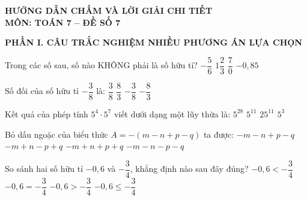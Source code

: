 \documentclass[12pt,a4paper]{article}
\begin{document}
\begin{center}
\textbf{\Large HƯỚNG DẪN CHẤM VÀ LỜI GIẢI CHI TIẾT}\\
\vspace{1.5mm}
\textbf{\large MÔN: TOÁN 7 -- ĐỀ SỐ 7}
\end{center}
\vspace{2mm}

\noindent\textbf{\large PHẦN I. CÂU TRẮC NGHIỆM NHIỀU PHƯƠNG ÁN LỰA CHỌN}

\vspace{1mm}
\begin{ex}
Trong các số sau, số nào KHÔNG phải là số hữu tỉ?
\choice
{$-\dfrac{5}{6}$}
{$1\dfrac{2}{3}$}
{\True $\dfrac{7}{0}$}
{$-0{,}85$}
\end{ex}

\begin{ex}
Số đối của số hữu tỉ $-\dfrac{3}{8}$ là:
\choice
{\True $\dfrac{3}{8}$}
{$\dfrac{8}{3}$}
{$-\dfrac{3}{8}$}
{$-\dfrac{8}{3}$}
\end{ex}

\begin{ex}
Kết quả của phép tính $5^4 \cdot 5^7$ viết dưới dạng một lũy thừa là:
\choice
{$5^{28}$}
{\True $5^{11}$}
{$25^{11}$}
{$5^3$}
\end{ex}

\begin{ex}
Bỏ dấu ngoặc của biểu thức $A = -(m - n + p - q)$ ta được:
\choice
{$-m - n + p - q$}
{\True $-m + n - p + q$}
{$-m + n + p + q$}
{$-m - n - p - q$}
\end{ex}

\begin{ex}
So sánh hai số hữu tỉ $-0{,}6$ và $-\dfrac{3}{4}$, khẳng định nào sau đây đúng?
\choice
{$-0{,}6 < -\dfrac{3}{4}$}
{$-0{,}6 = -\dfrac{3}{4}$}
{\True $-0{,}6 > -\dfrac{3}{4}$}
{$-0{,}6 \le -\dfrac{3}{4}$}
\end{ex}
\end{document}
